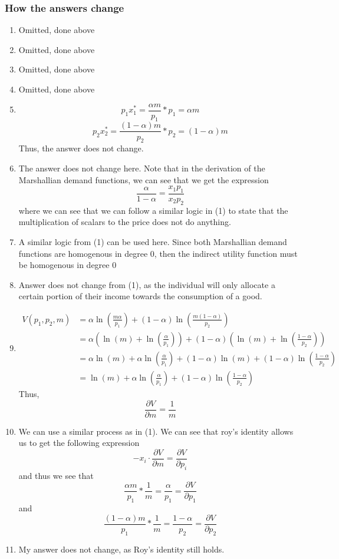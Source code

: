 \documentclass[12pt]{article}
\begin{document}
\subsubsection*{How the answers change}
\begin{enumerate}[label=\alph*]
    \item Omitted, done above
    \item Omitted, done above
    \item Omitted, done above
    \item Omitted, done above
    \item 
    \[
    p_1 x_1^* = \frac{\alpha m}{p_1} * p_1 = \alpha m 
    \]
    \[
    p_2 x_2^* = \frac{(1-\alpha)m}{p_2} * p_2 = (1-\alpha) m 
    \]
    Thus, the answer does not change.
    \item The answer does not change here. Note that in the derivation of the Marshallian demand functions, we can see that we get the expression
    \[
\frac{\alpha}{1-\alpha} = \frac{x_1 p_1}{x_2p_2}
    \]
    where we can see that we can follow a similar logic in (1) to state that the multiplication of scalars to the price does not do anything.
    \item A similar logic from (1) can be used here. Since both Marshallian demand functions are homogenous in degree 0, then the indirect utility function must be homogenous in degree 0
    \item Answer does not change from (1), as the individual will only allocate a certain portion of their income towards the consumption of a good. 
    \item \begin{align*}
        V(p_1, p_2, m) &= \alpha \ln\left(\frac{m \alpha}{p_1}\right) + (1-\alpha) \ln\left(\frac{m(1-\alpha)}{p_2}\right)\\
        &= \alpha \left( \ln(m) + \ln \left( \frac{\alpha}{p_1} \right) \right) + (1-\alpha)\left( \ln(m) + \ln \left( \frac{1-\alpha}{p_2} \right) \right)\\
        &= \alpha \ln(m) + \alpha \ln \left( \frac{\alpha}{p_1} \right) + (1-\alpha) \ln(m) + (1-\alpha) \ln \left( \frac{1-\alpha}{p_2} \right)\\
        &= \ln(m) +  \alpha \ln \left( \frac{\alpha}{p_1} \right) + (1-\alpha) \ln \left( \frac{1-\alpha}{p_2} \right)
    \end{align*}
    Thus, 
    \[
    \frac{\partial V}{\partial m} = \frac{1}{m}
    \]
    \item We can use a similar process as in (1). We can see that roy's identity allows us to get the following expression
    \[
        - x_i \cdot \frac{\partial V}{\partial m} = \frac{\partial V}{\partial p_i}
    \]
    and thus we see that 
    \[
    \frac{\alpha m}{p_1} * \frac{1}{m} = \frac{\alpha}{p_1} = \frac{\partial V}{\partial p_1}
    \]
    and 
    \[
    \frac{(1-\alpha)m }{p_1} * \frac{1}{m} = \frac{1-\alpha}{p_2} = \frac{\partial V}{\partial p_2}
    \]
    \item My answer does not change, as Roy's identity still holds. 
\end{enumerate}
\end{document}
